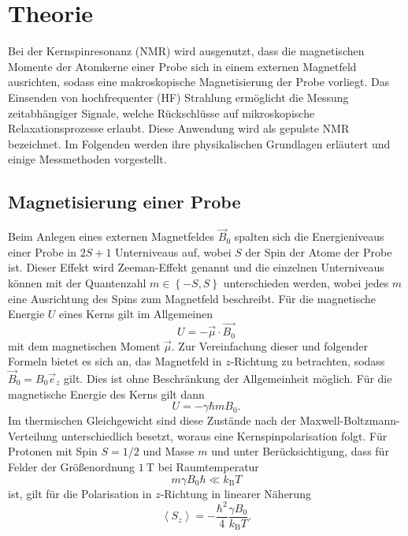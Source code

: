 \section{Theorie}
Bei der Kernspinresonanz (NMR) wird ausgenutzt, dass die magnetischen Momente der Atomkerne einer Probe sich in einem externen Magnetfeld ausrichten, sodass eine makroskopische Magnetisierung der Probe vorliegt. Das Einsenden von hochfrequenter (HF) Strahlung ermöglicht die Messung zeitabhängiger Signale, welche Rückschlüsse auf mikroskopische Relaxationsprozesse erlaubt. Diese Anwendung wird als gepulste NMR bezeichnet. Im Folgenden werden ihre physikalischen Grundlagen erläutert und einige Messmethoden vorgestellt.

\subsection{Magnetisierung einer Probe}
Beim Anlegen eines externen Magnetfeldes $\vec{B}_0$ spalten sich die Energieniveaus einer Probe in $2S + 1$ Unterniveaus auf, wobei $S$ der Spin der Atome der Probe ist. Dieser Effekt wird Zeeman-Effekt genannt und die einzelnen Unterniveaus können mit der Quantenzahl $m \in \left\{ -S,S \right\}$ unterschieden werden, wobei jedes $m$ eine Ausrichtung des Spins zum Magnetfeld beschreibt. Für die magnetische Energie $U$ eines Kerns gilt im Allgemeinen
\begin{equation*}
  U = - \vec{\mu} \cdot \vec{B_0}
\end{equation*}
mit dem magnetischen Moment $\vec{\mu}$. Zur Vereinfachung dieser und folgender Formeln bietet es sich an, das Magnetfeld in $z$-Richtung zu betrachten, sodass $\vec{B}_0 = B_0 \vec{e}_z$ gilt. Dies ist ohne Beschränkung der Allgemeinheit möglich. Für die magnetische Energie des Kerns gilt dann
\begin{equation*}
  U = - \gamma \hbar m B_0.
\end{equation*}
Im thermischen Gleichgewicht sind diese Zustände nach der Maxwell-Boltzmann-Verteilung unterschiedlich besetzt, woraus eine Kernspinpolarisation folgt. Für Protonen mit Spin $S = 1/2$ und Masse $m$ und unter Berücksichtigung, dass für Felder der Größenordnung $\SI{1}{\tesla}$ bei Raumtemperatur
\begin{equation*}
  m \gamma B_0 \hbar \ll k_\mathrm{B} T
\end{equation*}
ist, gilt für die Polarisation in $z$-Richtung in linearer Näherung
\begin{equation*}
  \left< S_z \right> = - \frac{\hbar^2}{4}\frac{\gamma B_0}{k_\text{B} T}.
\end{equation*}

